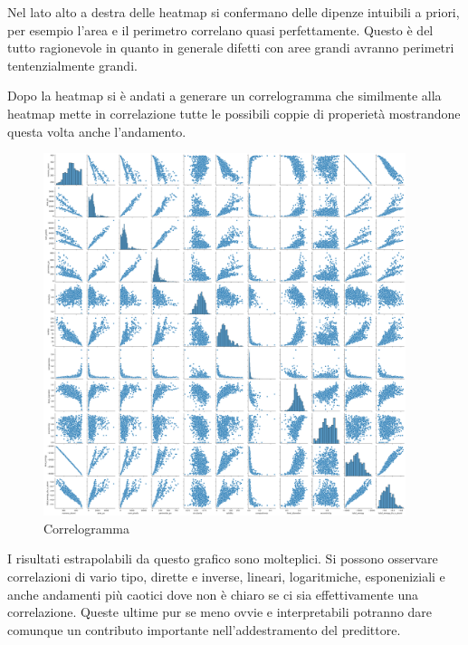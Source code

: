 \documentclass[12pt,a4paper,openright,twoside]{report}
\begin{document}
\newpage
Nel lato alto a destra delle heatmap si confermano delle dipenze intuibili a priori, per esempio l'area e il perimetro correlano quasi perfettamente. Questo è del tutto ragionevole in quanto in generale difetti con aree grandi avranno perimetri tentenzialmente grandi. 

Dopo la heatmap si è andati a generare un correlogramma che similmente alla heatmap mette in correlazione tutte le possibili coppie di properietà mostrandone questa volta anche l'andamento. 
\begin{center}
\begin{figure}[h]
\centering
\includegraphics[width=400px,keepaspectratio]{corr.png}
\caption{Correlogramma }
\end{figure}    
\end{center}
I risultati estrapolabili da questo grafico sono molteplici. Si possono osservare correlazioni di vario tipo, dirette e inverse, lineari, logaritmiche, esponeniziali e anche andamenti più caotici dove non è chiaro se ci sia effettivamente una correlazione. 
Queste ultime pur se meno ovvie e interpretabili potranno dare comunque un contributo importante nell'addestramento del predittore. 
\end{document}
